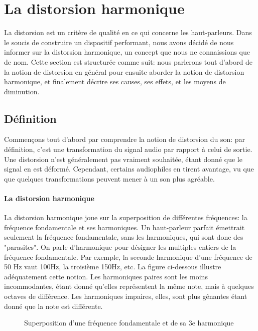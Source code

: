 

\section{La distorsion harmonique}

La distorsion est un critère de qualité en ce qui concerne les haut-parleurs.
Dans le soucis de construire un dispositif performant, nous avons décidé de 
nous informer sur la distorsion harmonique, un concept que nous ne connaissions
que de nom.
Cette section est structurée comme suit: nous parlerons tout d'abord de la notion  de distorsion 
en général pour ensuite aborder la notion  de distorsion 
harmonique, et finalement décrire ses causes, ses effets,
et les moyens de diminution.

\subsection{Définition}
Commençons tout d'abord par comprendre la notion de distorsion du son: par définition, c'est
une transformation du signal audio par rapport à celui de sortie. Une distorsion n'est généralement pas vraiment souhaitée, étant donné
que le signal en est déformé\cite{dico}. Cependant, certains audiophiles en tirent avantage, vu que que quelques
transformations peuvent mener à un son plus agréable\cite{encyclopedie}.

\paragraph{La distorsion harmonique}
La distorsion harmonique joue sur la superposition de différentes fréquences:
la fréquence fondamentale et ses harmoniques. Un haut-parleur parfait émettrait seulement la fréquence fondamentale, sans les harmoniques, qui sont donc des "parasites".
On parle d'harmonique pour désigner les multiples entiers de la fréquence fondamentale\cite{encyclopedia}.
Par exemple, la seconde harmonique d'une fréquence de 50 Hz vaut 100Hz, la troisième 150Hz, etc. La figure 
ci-dessous illustre adéquatement cette notion.
Les harmoniques paires sont les moins incommodantes, étant donné qu'elles représentent la même note, mais à quelques octaves de différence.
Les harmoniques impaires, elles, sont plus gênantes étant donné que la note est différente\cite{hartmann}.


\begin{figure}[ht!]
\centering
{}
\caption{Superposition d'une fréquence fondamentale et de sa 3e harmonique}
\label{lwp_ratio} 
\end{figure}

